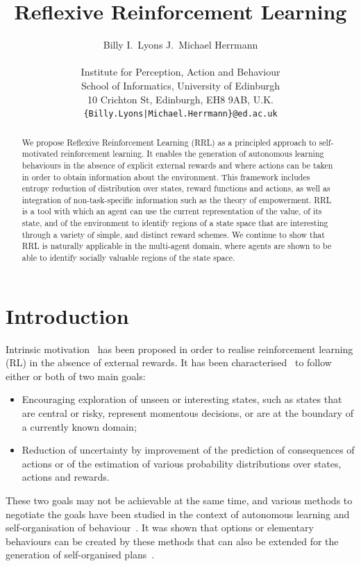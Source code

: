 \documentclass{article}
\title{Reflexive Reinforcement Learning}
\author{
  Billy I.~Lyons \quad \quad J.~Michael Herrmann \\
  \\
 {\normalsize Institute for Perception, Action and Behaviour}\\
 {\normalsize School of Informatics, University of Edinburgh}\\
 {\normalsize 10 Crichton St, Edinburgh, EH8 9AB, U.K.}\\
  \texttt{\normalsize\{Billy.Lyons|Michael.Herrmann\}@ed.ac.uk} \\
}
\date{}
\begin{document}
\maketitle

\begin{abstract}
We propose Reflexive Reinforcement Learning (RRL) as a principled 
approach to self-motivated reinforcement learning. It enables the generation of autonomous learning behaviours in the absence of explicit external rewards and where actions can be taken in order to obtain information about the environment. This framework includes entropy reduction of distribution over states, reward functions and actions, as well as integration of non-task-specific information such as the theory of empowerment. RRL is a tool with which an agent can use the current representation of the value, of its state, and of the environment to identify regions of a state space that are interesting through a variety of simple, and distinct reward schemes. We continue to show that RRL is naturally applicable in the multi-agent domain, where agents are shown to be able to identify socially valuable regions of the state space.%
%
\end{abstract}

\section{Introduction}

Intrinsic motivation~\cite{chentanez2005intrinsically} has been proposed in order to realise 
reinforcement learning (RL) in the absence of external rewards. It has been 
characterised~\cite{pathak2017curiosity} to follow either or both of two main goals:
\begin{itemize}
	\item Encouraging exploration of unseen or interesting states, such as states that
		are central or risky, represent momentous decisions, or are at the 
		boundary of a currently known domain;
	\item Reduction of uncertainty by improvement of the prediction of consequences of 
		actions or of the estimation of various probability distributions over
		states, actions and rewards.
\end{itemize}
These two goals may not be achievable at the same time, and various methods to negotiate the
goals have been studied in the context of autonomous learning and self-organisation 
of behaviour~\cite{bialek1999predictive,der2012playful,klyubin2005empowerment}.
It was shown that options or elementary behaviours can be created by these methods that can 
also be extended for the generation of self-organised plans~\cite{blaes2019control}. 
\end{document}
